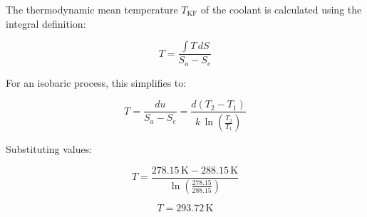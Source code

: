 The thermodynamic mean temperature \( T_{\text{KF}} \) of the coolant is calculated using the integral definition:  

\[
T = \frac{\int T \, dS}{S_a - S_e}
\]

For an isobaric process, this simplifies to:  

\[
T = \frac{du}{S_a - S_e} = \frac{d \left( T_2 - T_1 \right)}{k \, \ln \left( \frac{T_2}{T_1} \right)}
\]

Substituting values:  

\[
T = \frac{278.15 \, \text{K} - 288.15 \, \text{K}}{\ln \left( \frac{278.15}{288.15} \right)}
\]

\[
T = 293.72 \, \text{K}
\]